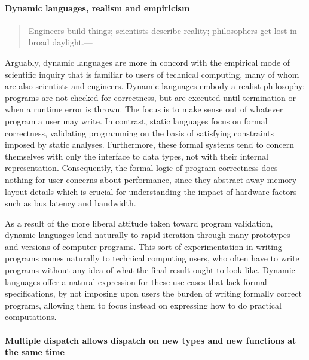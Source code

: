 \paragraph{Dynamic languages, realism and empiricism}

\begin{quote}
Engineers build things; scientists describe reality; philosophers get lost in broad daylight.---\cite{Gabriel2012}
\end{quote}

Arguably, dynamic languages are more in concord with the empirical mode of scientific inquiry that is familiar to users of technical computing, many of whom are also scientists and engineers. Dynamic languages embody a realist philosophy: programs are not checked for correctness, but are executed until termination or when a runtime error is thrown. The focus is to make sense out of whatever program a user may write. In contrast, static languages focus on formal correctness, validating programming on the basis of satisfying constraints imposed by static analyses. Furthermore, these formal systems tend to concern themselves with only the interface to data types, not with their internal representation. Consequently, the formal logic of program correctness does nothing for user concerns about performance, since they abstract away memory layout details which is crucial for understanding the impact of hardware factors such as bus latency and bandwidth.

As a result of the more liberal attitude taken toward program validation, dynamic languages lend naturally to rapid iteration through many prototypes and versions of computer programs. This sort of experimentation in writing programs comes naturally to technical computing users, who often have to write programs without any idea of what the final result ought to look like. Dynamic languages offer a natural expression for these use cases that lack formal specifications, by not imposing upon users the burden of writing formally correct programs, allowing them to focus instead on expressing how to do practical computations.

\paragraph{Multiple dispatch allows dispatch on new types and new functions at the same time}


